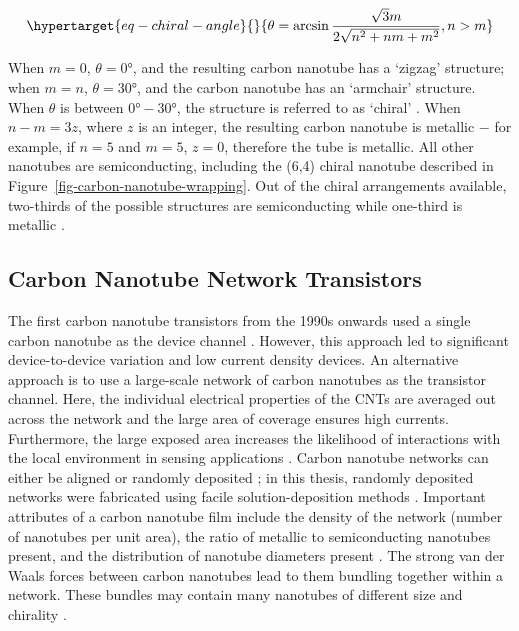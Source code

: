 \documentclass[
  a4paper,
]{scrbook}
\begin{document}
\begin{equation}\protect\hypertarget{eq-chiral-angle}{}{
\theta = \arcsin\frac{\sqrt{3}m}{2\sqrt{n^2+nm+m^2}}, \space n > m
}\label{eq-chiral-angle}\end{equation}

When \(m=0\), \(\theta = 0°\), and the resulting carbon nanotube has a
`zigzag' structure; when \(m=n\), \(\theta = 30°\), and the carbon
nanotube has an `armchair' structure. When \(\theta\) is between
\(0°-30°\), the structure is referred to as `chiral'
\autocite{Dekker1999,Lu2012}. When \(n-m=3z\), where \(z\) is an
integer, the resulting carbon nanotube is metallic \(-\) for example, if
\(n=5\) and \(m=5\), \(z=0\), therefore the tube is metallic. All other
nanotubes are semiconducting, including the (6,4) chiral nanotube
described in Figure~\ref{fig-carbon-nanotube-wrapping}. Out of the
chiral arrangements available, two-thirds of the possible structures are
semiconducting while one-third is metallic \autocite{Dekker1999}.

\hypertarget{sec-cnt-network-details}{%
\subsection{Carbon Nanotube Network
Transistors}\label{sec-cnt-network-details}}

The first carbon nanotube transistors from the 1990s onwards used a
single carbon nanotube as the device channel
\autocite{Martel1998,Tans1998}. However, this approach led to
significant device-to-device variation and low current density devices.
An alternative approach is to use a large-scale network of carbon
nanotubes as the transistor channel. Here, the individual electrical
properties of the CNTs are averaged out across the network and the large
area of coverage ensures high currents. Furthermore, the large exposed
area increases the likelihood of interactions with the local environment
in sensing applications
\autocite{Hu2004,Cao2009,Murugathas2019a,Li2023}. Carbon nanotube
networks can either be aligned or randomly deposited
\autocite{Cao2009,Shkodra2021}; in this thesis, randomly deposited
networks were fabricated using facile solution-deposition methods
\autocite{Zheng2017,Cassie2023}. Important attributes of a carbon
nanotube film include the density of the network (number of nanotubes
per unit area), the ratio of metallic to semiconducting nanotubes
present, and the distribution of nanotube diameters present
\autocite{Cao2009,Shkodra2021}. The strong van der Waals forces between
carbon nanotubes lead to them bundling together within a network. These
bundles may contain many nanotubes of different size and chirality
\autocite{Fuhrer2000,Hu2004,Cao2009,Murugathas2019a}.
\end{document}
